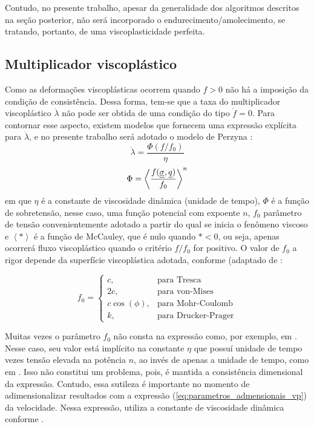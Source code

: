 Contudo, no presente trabalho, apesar da generalidade dos algoritmos descritos na seção posterior, não será incorporado o endurecimento/amolecimento, se tratando, portanto, de uma viscoplasticidade perfeita.

\subsection{Multiplicador viscoplástico}
Como as deformações viscoplásticas ocorrem quando $f>0$ não há a imposição da condição de consistência. Dessa forma, tem-se que a taxa do multiplicador viscoplástico $\dot \lambda$ não pode ser obtida de uma condição do tipo $\dot f = 0$. Para contornar esse aspecto, existem modelos que fornecem uma expressão explícita para $\dot \lambda$, e no presente trabalho será adotado o modelo de Perzyna \cite[p. 823]{Zienkiewicz1974}:
\begin{equation}
	\label{eq:lambdavp}
	\dot \lambda = \dfrac{\Phi(f/f_0)}{\eta}
\end{equation}
\begin{equation}
	\label{eq:sobretensao}
	\Phi = \left\langle  \dfrac{f(\underline{\underline \sigma},\underline q)}{f_0} \right\rangle^n
\end{equation}
em que $\eta$ é a constante de viscosidade dinâmica (unidade de tempo), $\Phi$ é a função de sobretensão, nesse caso, uma função potencial com expoente $n$, $f_0$ parâmetro de tensão convenientemente adotado a partir do qual se inicia o fenômeno viscoso e $\left\langle * \right\rangle$ é a função de McCauley, que é nulo quando $*<0$, ou seja, apenas ocorrerá fluxo viscoplástico quando o critério $f/f_0$ for positivo. O valor de $f_0$ a rigor depende da superfície viscoplástica adotada, conforme (adaptado de :

\begin{equation}
	\label{eq:f0}
	f_0 = \left\{ \begin{array}{ll} 
		c, & \text{para Tresca} \\
		2c, & \text{para von-Mises} \\
		c\cos(\phi), & \text{para Mohr-Coulomb} \\ 
		 k, & \text{para Drucker-Prager}\end{array}	
	\right.
\end{equation}


Muitas vezes o parâmetro $f_0$ não consta na expressão como, por exemplo, em . Nesse caso, seu valor está implícito na constante $\eta$ que possuí unidade de tempo vezes tensão elevada na potência $n$, ao invés de apenas a unidade de tempo, como em . Isso não constitui um problema, pois, é mantida a consistência dimensional da expressão. Contudo, essa sutileza é importante no momento de adimensionalizar resultados com a expressão (\ref{eq:parametros_admensionais_vp}) da velocidade. Nessa expressão,  utiliza a constante de viscosidade dinâmica conforme .

